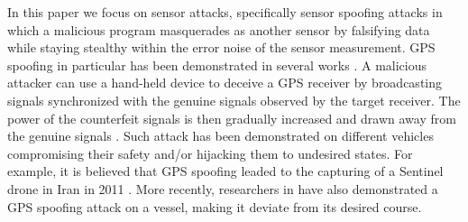\documentclass[letterpaper, 10 pt, conference]{ieeeconf}  %
\begin{document}
In this paper we focus on sensor attacks, specifically sensor spoofing attacks in which a malicious program masquerades as another sensor by falsifying data while staying stealthy within the error noise of the sensor measurement. GPS spoofing in particular has been demonstrated in several works \cite{humphreys2008assessing, protecting_gps_2016, peterson_faramarzi_2011}. A malicious attacker can use a hand-held device to deceive a GPS receiver by broadcasting signals synchronized with the genuine signals observed by the target receiver. The power of the counterfeit signals is then gradually increased and drawn away from the genuine signals \cite{humphreys2008assessing}. Such attack has been demonstrated on different vehicles compromising their safety and/or hijacking them to undesired states.
%
%
For example, it is believed that GPS spoofing leaded to the capturing of a Sentinel drone in Iran in 2011 \cite{peterson_faramarzi_2011}. More recently, researchers in \cite{protecting_gps_2016} have also demonstrated a GPS spoofing attack on a vessel, making it deviate from its desired course.
 
\end{document}
